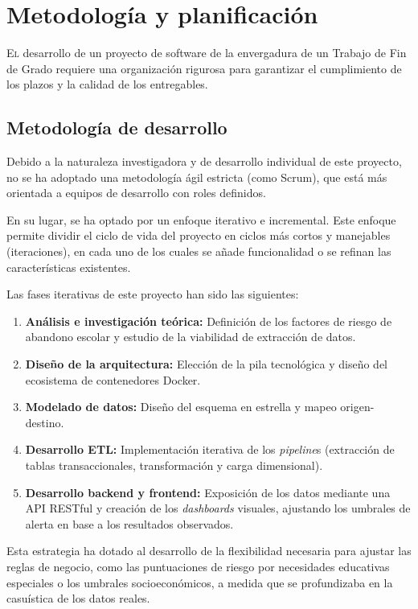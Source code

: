 \chapter{Metodología y planificación}
\label{chap:metodologia}

\lettrine{E}{l} desarrollo de un proyecto de software de la envergadura de un Trabajo de Fin de Grado requiere una organización rigurosa para garantizar el cumplimiento de los plazos y la calidad de los entregables. 

\section{Metodología de desarrollo}
Debido a la naturaleza investigadora y de desarrollo individual de este proyecto, no se ha adoptado una metodología ágil estricta (como Scrum), que está más orientada a equipos de desarrollo con roles definidos. 

En su lugar, se ha optado por un enfoque iterativo e incremental. Este enfoque permite dividir el ciclo de vida del proyecto en ciclos más cortos y manejables (iteraciones), en cada uno de los cuales se añade funcionalidad o se refinan las características existentes.

Las fases iterativas de este proyecto han sido las siguientes:
\begin{enumerate}
    \item \textbf{Análisis e investigación teórica:} Definición de los factores de riesgo de abandono escolar y estudio de la viabilidad de extracción de datos.
    \item \textbf{Diseño de la arquitectura:} Elección de la pila tecnológica y diseño del ecosistema de contenedores Docker.
    \item \textbf{Modelado de datos:} Diseño del esquema en estrella y mapeo origen-destino.
    \item \textbf{Desarrollo ETL:} Implementación iterativa de los \textit{pipeline}s (extracción de tablas transaccionales, transformación y carga dimensional).
    \item \textbf{Desarrollo backend y frontend:} Exposición de los datos mediante una API RESTful y creación de los \textit{dashboards} visuales, ajustando los umbrales de alerta en base a los resultados observados.
\end{enumerate}

Esta estrategia ha dotado al desarrollo de la flexibilidad necesaria para ajustar las reglas de negocio, como las puntuaciones de riesgo por necesidades educativas especiales o los umbrales socioeconómicos, a medida que se profundizaba en la casuística de los datos reales.

